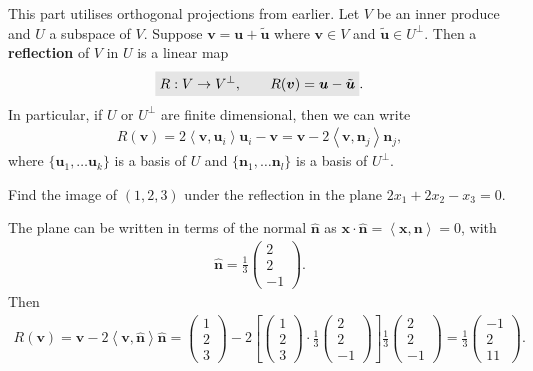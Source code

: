 \documentclass[letter-paper]{tufte-book}
\newenvironment{example}[1][Example]{\begin{trivlist}
\item[\hskip \labelsep {\bfseries #1}]}{\end{trivlist}}
\newcommand{\inner}[2]{\left\langle #1, #2\right\rangle}
\newcommand{\nb}{{\boldsymbol{n}}}
\newcommand{\ub}{{\boldsymbol{u}}}
\newcommand{\vb}{{\boldsymbol{v}}}
\newcommand{\xb}{{\boldsymbol{x}}}
\newcommand{\highlight}[1]{\mathchoice%
  {\colorbox{black!10}{$\displaystyle#1$}}%
  {\colorbox{black!10}{$\textstyle#1$}}%
  {\colorbox{black!10}{$\scriptstyle#1$}}%
  {\colorbox{black!10}{$\scriptscriptstyle#1$}}}%
\begin{document}
This part utilises orthogonal projections from earlier. Let $V$ be an inner produce and $U$ a subspace of $V$. Suppose $\vb = \ub + \tilde{\ub}$ where $\vb\in V$ and $\tilde{\ub} \in U^\perp$. Then a \textbf{reflection} of $V$ in $U$ is a linear map
\begin{align}
  \highlight{R:V \to V^\perp, \qquad R(\vb) = \ub - \tilde{\ub}}.
\end{align}
In particular, if $U$ or $U^\perp$ are finite dimensional, then we can write
\begin{align*}
  R(\vb) = 2 \inner{\vb}{\ub_i}\ub_i - \vb = \vb - 2\inner{\vb}{\nb_j}\nb_j,
\end{align*}
where $\{\ub_1, \ldots \ub_k\}$ is a basis of $U$ and $\{\nb_1, \ldots \nb_l\}$ is a basis of $U^\perp$.

\begin{example}
  Find the image of $(1,2,3)$ under the reflection in the plane $2x_1 + 2x_2 - x_3 = 0$.
  
  The plane can be written in terms of the normal $\hat{\nb}$ as $\xb\cdot\hat{\nb} = \inner{\xb}{\nb} = 0$, with
  \begin{align*}
    \hat{\nb} = \frac{1}{3}\begin{pmatrix} 2 \\ 2 \\ -1 \end{pmatrix}.
  \end{align*}
  Then
  \begin{align*}
    R(\vb) = \vb - 2\inner{\vb}{\hat{\nb}}\hat{\nb} = \begin{pmatrix} 1 \\ 2 \\ 3 \end{pmatrix} - 2 \left[\begin{pmatrix} 1 \\ 2 \\ 3 \end{pmatrix} \cdot \frac{1}{3}\begin{pmatrix} 2 \\ 2 \\ -1 \end{pmatrix}\right] \frac{1}{3}\begin{pmatrix} 2 \\ 2 \\ -1 \end{pmatrix} = \frac{1}{3}\begin{pmatrix} -1 \\ 2 \\ 11 \end{pmatrix}.
  \end{align*}
\end{example}
\end{document}
